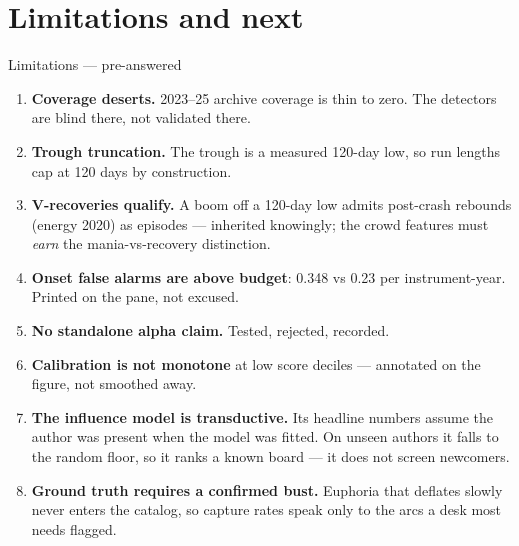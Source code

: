 \documentclass[aspectratio=169,11pt]{beamer}
\begin{document}
\section{Limitations and next}
\begin{frame}{Limitations --- pre-answered}
  \footnotesize
  \begin{enumerate}
    \item \textbf{Coverage deserts.} 2023--25 archive coverage is thin to
      zero. The detectors are blind there, not validated there.
    \item \textbf{Trough truncation.} The trough is a measured 120-day low, so
      run lengths cap at 120 days by construction.
    \item \textbf{V-recoveries qualify.} A boom off a 120-day low admits
      post-crash rebounds (energy 2020) as episodes --- inherited knowingly;
      the crowd features must \emph{earn} the mania-vs-recovery distinction.
    \item \textbf{Onset false alarms are above budget}: 0.348 vs 0.23 per
      instrument-year. Printed on the pane, not excused.
    \item \textbf{No standalone alpha claim.} Tested, rejected, recorded.
    \item \textbf{Calibration is not monotone} at low score deciles ---
      annotated on the figure, not smoothed away.
    \item \textbf{The influence model is transductive.} Its headline numbers
      assume the author was present when the model was fitted. On unseen
      authors it falls to the random floor, so it ranks a known board --- it
      does not screen newcomers.
    \item \textbf{Ground truth requires a confirmed bust.} Euphoria that
      deflates slowly never enters the catalog, so capture rates speak only to
      the arcs a desk most needs flagged.
  \end{enumerate}
\end{frame}
\end{document}
